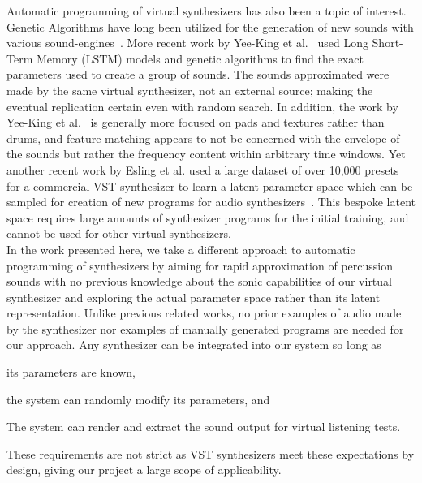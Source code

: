 \documentclass[\main/thesis.tex]{subfiles}
\begin{document}
Automatic programming of virtual synthesizers has also been a topic of interest. Genetic Algorithms have long been utilized for the generation of new sounds with various sound-engines~\cite{johnson1999exploring,dahlstedt2001creating,hornermachinetongues,macret2012automatic}. More recent work by Yee-King et al.~\cite{yee2018automatic} used Long Short-Term Memory (LSTM) models and genetic algorithms to find the exact parameters used to create a group of sounds. The sounds approximated were made by the same virtual synthesizer, not an external source; making the eventual replication certain even with random search. In addition, the work by Yee-King et al.~\cite{yee2018automatic} is generally more focused on pads and textures rather than drums, and feature matching appears to not be concerned with the envelope of the sounds but rather the frequency content within arbitrary time windows. Yet another recent work by Esling et al. used a large dataset of over 10,000 presets for a commercial VST synthesizer to learn a latent parameter space which can be sampled for creation of new programs for audio synthesizers~\cite{esling2019universal}. This bespoke latent space requires large amounts of synthesizer programs for the initial training, and cannot be used for other virtual synthesizers.\\
In the work presented here, we take a different approach to automatic programming of synthesizers by aiming for rapid approximation of percussion sounds with no previous knowledge about the sonic capabilities of our virtual synthesizer and exploring the actual parameter space rather than its latent representation. Unlike previous related works, no prior examples of audio made by the synthesizer nor examples of manually generated programs are needed for our approach. Any synthesizer can be integrated into our system so long as \begin {enumerate*} [label=\itshape\alph*\upshape)]
  \item its parameters are known,
  \item the system can randomly modify its parameters, and
  \item The system can render and extract the sound output for virtual listening tests.
\end{enumerate*}  
These requirements are not strict as VST synthesizers meet these expectations by design, giving our project a large scope of applicability. 
\end{document}
